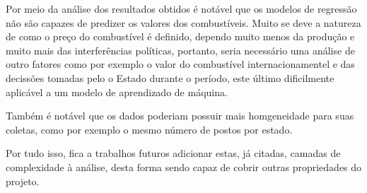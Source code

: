 Por meio da análise dos resultados obtidos é notável que os modelos de regressão não são capazes de predizer
os valores dos combustíveis. Muito se deve a natureza de como o preço do combustível é definido, dependo
muito menos da produção e muito mais das interferências políticas, portanto, seria necessário uma análise 
de outro fatores como por exemplo o valor do combustível internacionamentel e das decissões tomadas 
pelo o Estado durante o período, este último dificilmente aplicável a um modelo de aprendizado de máquina.

Também é notável que os dados poderiam possuir mais homgeneidade para suas coletas, como por exemplo o mesmo 
número de postos por estado. 

Por tudo isso, fica a trabalhos futuros adicionar estas, já citadas, camadas de complexidade à análise, desta
forma sendo capaz de cobrir outras propriedades do projeto.